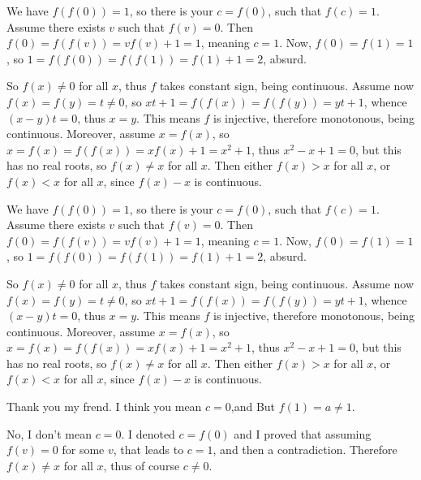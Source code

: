 \begin{solution}
	We have $f(f(0)) = 1$, so there is your $c = f(0)$, such that $f(c) = 1$. Assume there exists $v$ such that $f(v) = 0$. Then $f(0) = f(f(v)) = vf(v) + 1 = 1$, meaning $c=1$. Now, $f(0) = f(1) = 1$, so $1 = f(f(0)) = f(f(1)) = f(1)+1 = 2$, absurd.

So $f(x) \neq 0$ for all $x$, thus $f$ takes constant sign, being continuous. Assume now $f(x) = f(y) = t \neq 0$, so  $xt+1 = f(f(x)) = f(f(y))= yt + 1$, whence $(x-y)t=0$, thus $x=y$. This means $f$ is injective, therefore monotonous, being continuous. Moreover, assume $x=f(x)$, so $x = f(x) = f(f(x)) = xf(x) + 1 = x^2+1$, thus $x^2-x+1 = 0$, but this has no real roots, so $f(x) \neq x$ for all $x$. Then either $f(x) > x$ for all $x$, or $f(x) < x$ for all $x$, since $f(x)-x$ is continuous.
\end{solution}



\begin{solution}
	\begin{tcolorbox}We have $f(f(0)) = 1$, so there is your $c = f(0)$, such that $f(c) = 1$. Assume there exists $v$ such that $f(v) = 0$. Then $f(0) = f(f(v)) = vf(v) + 1 = 1$, meaning $c=1$. Now, $f(0) = f(1) = 1$, so $1 = f(f(0)) = f(f(1)) = f(1)+1 = 2$, absurd.

So $f(x) \neq 0$ for all $x$, thus $f$ takes constant sign, being continuous. Assume now $f(x) = f(y) = t \neq 0$, so  $xt+1 = f(f(x)) = f(f(y))= yt + 1$, whence $(x-y)t=0$, thus $x=y$. This means $f$ is injective, therefore monotonous, being continuous. Moreover, assume $x=f(x)$, so $x = f(x) = f(f(x)) = xf(x) + 1 = x^2+1$, thus $x^2-x+1 = 0$, but this has no real roots, so $f(x) \neq x$ for all $x$. Then either $f(x) > x$ for all $x$, or $f(x) < x$ for all $x$, since $f(x)-x$ is continuous.\end{tcolorbox}

Thank you  my frend. I think you mean $c=0$,and But $f(1)=a\neq 1$.
\end{solution}



\begin{solution}
	No, I don't mean $c=0$. I denoted $c=f(0)$ and I proved that assuming $f(v) = 0$ for some $v$, that leads to $c=1$, and then a contradiction. Therefore $f(x)\neq x$ for all $x$, thus of course $c\neq 0$.
\end{solution}



